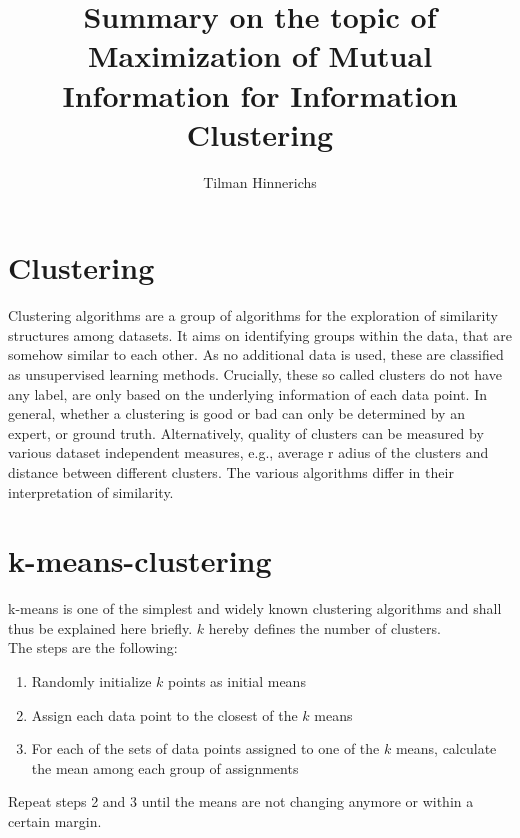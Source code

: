 \documentclass[]{article}
\title{Summary on the topic of Maximization of Mutual Information for Information Clustering}
\author{Tilman Hinnerichs}
\begin{document}
\maketitle
\section{Clustering}
Clustering algorithms are a group of algorithms for the exploration of similarity structures among datasets. It aims on identifying groups within the data, that are somehow similar to each other. As no additional data is used, these are classified as unsupervised learning methods. Crucially, these so called clusters do not have any label, are only based on the underlying information of each data point. In general, whether a clustering is good or bad can only be determined by an expert, or ground truth. Alternatively, quality of clusters can be measured by various dataset independent measures, e.g., average r adius of the clusters and distance between different clusters. The various algorithms differ in their interpretation of similarity. \\
\section{k-means-clustering}
k-means is one of the simplest and widely known clustering algorithms and shall thus be explained here briefly. $k$ hereby defines the number of clusters.\\
The steps are the following:
\begin{enumerate}
	\item Randomly initialize $k$ points as initial means 
	\item Assign each data point to the closest of the $k$ means
	\item For each of the sets of data points assigned to one of the $k$ means, calculate the mean among each group of assignments
\end{enumerate}
Repeat steps 2 and 3 until the means are not changing anymore or within a certain margin.
\end{document}
